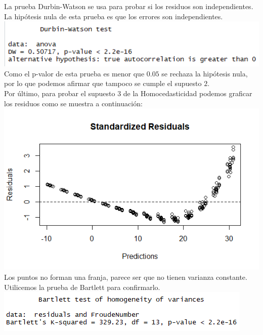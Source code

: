 \documentclass[twoside]{article}
\begin{document}
\begin{multicols}{2}
La prueba Durbin-Watson se usa para probar si los residuos son independientes. La hip\'otesis nula de esta prueba es que los errores son independientes.\\

\includegraphics[scale = 0.5]{images/pic_18.png} \\

Como el p-valor de esta prueba es menor que $0.05$ se rechaza la hip\'otesis nula, por lo que podemos afirmar que tampoco se cumple el supuesto $2$.\\

Por \'ultimo, para probar el supuesto $3$ de la Homocedasticidad podemos graficar los residuos como se muestra a continuaci\'on:\\

\includegraphics[scale = 0.4]{images/pic_19.png} \\

Los puntos no forman una franja, parece ser que no tienen varianza constante. Utilicemos la prueba de Bartlett para confirmarlo.\\

\includegraphics[scale = 0.5]{images/pic_20.png} \\


\end{multicols}
\end{document}
